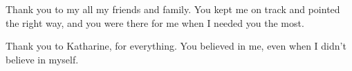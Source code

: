 \documentclass{ucbthesis}
\begin{document}
\begin{frontmatter}
\begin{acknowledgements}
Thank you to my all my friends and family. You kept me on track and pointed the
right way, and you were there for me when I needed you the most.

Thank you to Katharine, for everything. You believed in me, even when I didn't
believe in myself.

\end{acknowledgements}

\end{frontmatter}

\pagestyle{headings}








\end{document}
